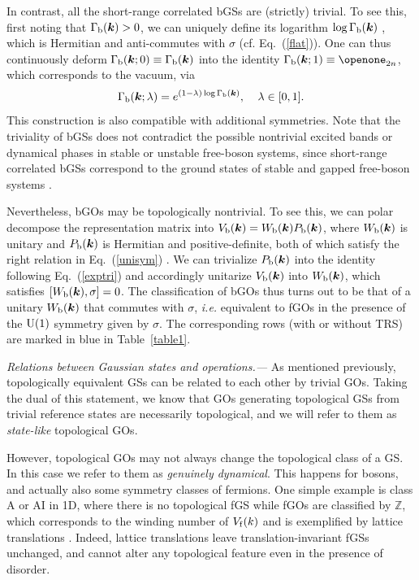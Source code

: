 \documentclass[prl,twocolumn,preprintnumbers,superscriptaddress,amsmath,amssymb]{revtex4-1}
\begin{document}
In contrast, all the short-range correlated bGSs are (strictly) trivial. To see this, first noting that $\Gamma_{\rm b}(\boldsymbol{k})>0$, we can uniquely define its logarithm $\log\Gamma_{\rm b}(\boldsymbol{k})$  \cite{Higham2008}, which is Hermitian and anti-commutes with $\sigma$ (cf. Eq.~(\ref{flat})). One can thus continuously deform $\Gamma_{\rm b}(\boldsymbol{k};0)\equiv\Gamma_{\rm b}(\boldsymbol{k})$ into the identity $\Gamma_{\rm b}(\boldsymbol{k};1)\equiv\openone_{2n}$, which corresponds to the vacuum, via
\begin{equation}
\Gamma_{\rm b}(\boldsymbol{k};\lambda) = e^{(1-\lambda)\log\Gamma_{\rm b}(\boldsymbol{k}) },\;\;\;\;\lambda\in[0,1].
\label{exptri}
\end{equation}
This construction is also compatible with additional symmetries. Note that the triviality of bGSs does not contradict the possible nontrivial excited bands \cite{Raghu2008,Hafezi2011,Cooper2019} or dynamical phases \cite{Clerk2018} in stable or unstable free-boson systems, since short-range correlated bGSs correspond to the ground states of stable and gapped free-boson systems \cite{Schuch2006}.

Nevertheless, bGOs may be topologically nontrivial. To see this, we can polar decompose the representation matrix into $V_{\rm b}(\boldsymbol{k})=W_{\rm b}(\boldsymbol{k})P_{\rm b}(\boldsymbol{k})$, where $W_{\rm b}(\boldsymbol{k})$ is unitary and $P_{\rm b}(\boldsymbol{k})$ is Hermitian and positive-definite, both of which satisfy the right relation in Eq.~(\ref{unisym}) \cite{SM}. We can trivialize $P_{\rm b}(\boldsymbol{k})$ into the identity following Eq.~(\ref{exptri}) and accordingly unitarize $V_{\rm b}(\boldsymbol{k})$ into $W_{\rm b}(\boldsymbol{k})$, which satisfies $[W_{\rm b}(\boldsymbol{k}),\sigma]=0$. The classification of bGOs thus turns out to be that of a unitary $W_{\rm b}(\boldsymbol{k})$ that commutes with $\sigma$, \textit{i.e.} equivalent to fGOs in the presence of the ${\rm U}(1)$ symmetry given by $\sigma$. The corresponding rows (with or without TRS) are marked in blue in Table~\ref{table1}.


\emph{Relations between Gaussian states and operations.---} As mentioned previously, topologically equivalent GSs can be related to each other by trivial GOs. Taking the dual of this statement, we know that GOs generating topological GSs from trivial reference states are necessarily topological, and we will refer to them as \emph{state-like} topological GOs. 

However, topological GOs may not always change the topological class of a GS. In this case we refer to them as \emph{genuinely dynamical}. This happens for bosons, and actually also some symmetry classes of fermions. One simple example is class A  or AI in 1D,  where there is no topological fGS while fGOs are classified by $\mathbb{Z}$, which corresponds to the winding number of $V_{\rm f}(k)$ \cite{Kitagawa2010} and is exemplified by lattice translations \cite{Gross2012}. Indeed, lattice translations leave translation-invariant fGSs unchanged, and cannot alter any topological feature even in the presence of disorder.
\end{document}
